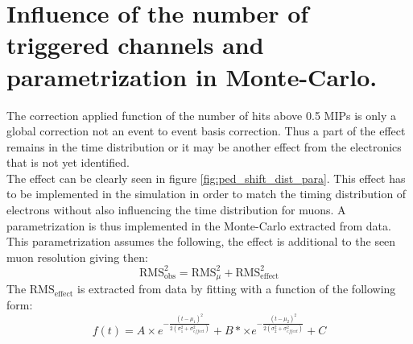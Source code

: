 \chapter{Influence of the number of triggered channels and parametrization in Monte-Carlo.}
\label{appendix:ped_shift}

The correction applied function of the number of hits above 0.5 MIPs is only a global correction not an event to event basis correction. Thus a part of the effect remains in the time distribution or it may be another effect from the electronics that is not yet identified.\\
The effect can be clearly seen in figure \ref{fig:ped_shift_dist_para}. This effect has to be implemented in the simulation in order to match the timing distribution of electrons without also influencing the time distribution for muons. A parametrization is thus implemented in the Monte-Carlo extracted from data. This parametrization assumes the following, the effect is additional to the seen muon resolution giving then:
\begin{equation*}
	\text{RMS}_{\text{obs}}^2 = \text{RMS}_{\mu}^2 + \text{RMS}_{\text{effect}}^2
\end{equation*}
The $\text{RMS}_{\text{effect}}$ is extracted from data by fitting with a function of the following form:
\begin{equation*}
	f(t) = A \times e^{-\frac{(t-\mu_1)^2}{2(\sigma_1^2 + \sigma_{effect}^2)}} + B* \times e^{-\frac{(t-\mu_2)^2}{2(\sigma_2^2 + \sigma_{effect}^2)}} + C
\end{equation*}

